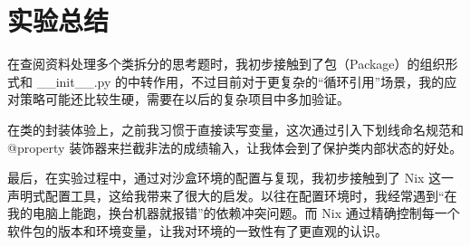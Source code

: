 \documentclass[12pt,a4paper]{ctexart}
\begin{document}
	\section{实验总结}
	在查阅资料处理多个类拆分的思考题时，我初步接触到了包（Package）的组织形式和 \_\_init\_\_.py 的中转作用，不过目前对于更复杂的“循环引用”场景，我的应对策略可能还比较生硬，需要在以后的复杂项目中多加验证。
	
	在类的封装体验上，之前我习惯于直接读写变量，这次通过引入下划线命名规范和 @property 装饰器来拦截非法的成绩输入，让我体会到了保护类内部状态的好处。
	
	最后，在实验过程中，通过对沙盒环境的配置与复现，我初步接触到了 Nix 这一声明式配置工具，这给我带来了很大的启发。以往在配置环境时，我经常遇到“在我的电脑上能跑，换台机器就报错”的依赖冲突问题。而 Nix 通过精确控制每一个软件包的版本和环境变量，让我对环境的一致性有了更直观的认识。
	
\end{document}
